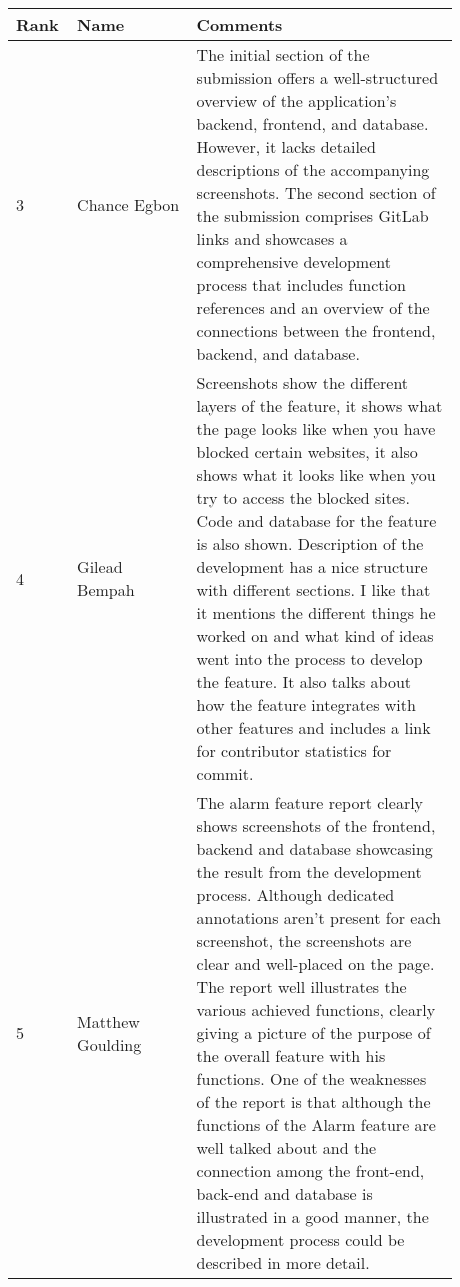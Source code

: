 \documentclass[a4paper]{article}
\begin{document}
 {\noindent\begin{tabular}{|p{0.075\linewidth}|p{0.25\linewidth}|p{0.55\linewidth}|} 
	\hline
 \textbf{Rank} & \textbf{Name} & \textbf{Comments} \\
 \hline
 3 & Chance Egbon& The initial section of the submission offers a well-structured overview of the application's backend, frontend, and database. However, it lacks detailed descriptions of the accompanying screenshots. The second section of the submission comprises GitLab links and showcases a comprehensive development process that includes function references and an overview of the connections between the frontend, backend, and database.\\
 \hline
 4 & Gilead Bempah & Screenshots show the different layers of the feature, it shows what the page looks like when you have blocked certain websites, it also shows what it looks like when you try to access the blocked sites. Code and database for the feature is also shown. Description of the development has a nice structure with different sections. I like that it mentions the different things he worked on and what kind of ideas went into the process to develop the feature. It also talks about how the feature integrates with other features and includes a link for contributor statistics for commit.\\
 \hline
 5 & Matthew Goulding & The alarm feature report clearly shows screenshots of the frontend, backend and database showcasing the result from the development process. Although dedicated annotations aren’t present for each screenshot, the screenshots are clear and well-placed on the page.  The report well illustrates the various achieved functions, clearly giving a picture of the purpose of the overall feature with his functions.  One of the weaknesses of the report is that although the functions of the Alarm feature are well talked about and the connection among the front-end, back-end and database is illustrated in a good manner, the development process could be described in more detail.\\
 \hline
\end{tabular}}
\end{document}

